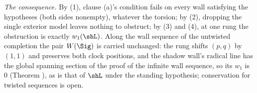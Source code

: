 \emph{The consequence.} By (1), clause (a)'s condition fails on every wall satisfying the hypotheses (both sides nonempty), whatever the torsion; by (2), dropping the single exterior model leaves nothing to obstruct; by (3) and (4), at one rung the obstruction is exactly $w_1(\shL)$. Along the wall sequence of the untwisted completion the pair $W(\Sig)$ is carried unchanged: the rung shifts $(p,q)$ by $(1,1)$ and preserves both clock positions, and the shadow wall's radical line has the global spanning section of the proof of the infinite wall sequence, so its $w_1$ is $0$ (Theorem ), as is that of $\shL$ under the standing hypothesis; conservation for twisted sequences is open.
